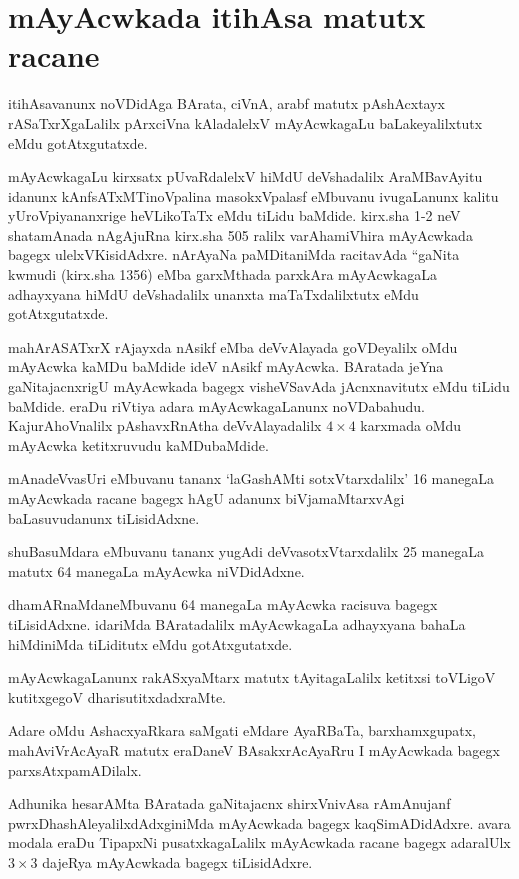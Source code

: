 \chapter{mAyAcwkada itihAsa matutx racane}

itihAsavanunx noVDidAga BArata, ciVnA, arabf matutx pAshAcxtayx rASaTxrXgaLalilx pArxciVna kAladalelxV mAyAcwkagaLu baLakeyalilxtutx eMdu gotAtxgutatxde.

mAyAcwkagaLu kirxsatx pUvaRdalelxV hiMdU deVshadalilx AraMBavAyitu idanunx kAnfsATxMTinoVpalina masokxVpalasf eMbuvanu ivugaLanunx kalitu yUroVpiyananxrige heVLikoTaTx eMdu tiLidu baMdide. kirx.sha {\rm 1-2} neV shatamAnada nAgAjuRna kirx.sha {\rm 505} ralilx varAhamiVhira mAyAcwkada bagegx ulelxVKisidAdxre. nArAyaNa paMDitaniMda racitavAda ``gaNita kwmudi (kirx.sha {\rm 1356}) eMba garxMthada parxkAra mAyAcwkagaLa adhayxyana hiMdU deVshadalilx unanxta maTaTxdalilxtutx eMdu gotAtxgutatxde.

mahArASATxrX rAjayxda nAsikf eMba deVvAlayada goVDeyalilx oMdu mAyAcwka kaMDu baMdide ideV nAsikf mAyAcwka. BAratada jeYna gaNitajacnxrigU mAyAcwkada bagegx visheVSavAda jAcnxnavitutx eMdu tiLidu baMdide. eraDu riVtiya adara mAyAcwkagaLanunx noVDabahudu. KajurAhoVnalilx pAshavxRnAtha deVvAlayadalilx $4\times 4$ karxmada oMdu mAyAcwka ketitxruvudu kaMDubaMdide.

mAnadeVvasUri eMbuvanu tananx `laGashAMti sotxVtarxdalilx' {\rm 16} manegaLa mAyAcwkada racane bagegx hAgU adanunx biVjamaMtarxvAgi baLasuvudanunx tiLisidAdxne.

shuBasuMdara eMbuvanu tananx yugAdi deVvasotxVtarxdalilx {\rm 25} manegaLa matutx {\rm 64} manegaLa mAyAcwka niVDidAdxne.

dhamARnaMdaneMbuvanu {\rm 64} manegaLa mAyAcwka racisuva bagegx tiLisidAdxne. idariMda BAratadalilx mAyAcwkagaLa adhayxyana bahaLa hiMdiniMda tiLiditutx eMdu gotAtxgutatxde.

mAyAcwkagaLanunx rakASxyaMtarx matutx tAyitagaLalilx ketitxsi toVLigoV kutitxgegoV dharisutitxdadxraMte.

Adare oMdu AshacxyaRkara saMgati eMdare AyaRBaTa, barxhamxgupatx, mahAviVrAcAyaR matutx eraDaneV BAsakxrAcAyaRru I mAyAcwkada bagegx parxsAtxpamADilalx.

Adhunika hesarAMta BAratada gaNitajacnx shirxVnivAsa rAmAnujanf pwrxDhashAleyalilxdAdxginiMda mAyAcwkada bagegx kaqSimADidAdxre. avara modala eraDu TipapxNi pusatxkagaLalilx mAyAcwkada racane bagegx adaralUlx $3\times 3$ dajeRya mAyAcwkada bagegx tiLisidAdxre.


